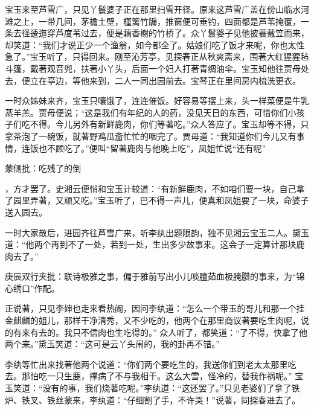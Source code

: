 \begin{parag}


    宝玉来至芦雪广，只见丫鬟婆子正在那里扫雪开径。原来这芦雪广盖在傍山临水河滩之上，一带几间，茅檐土壁，槿篱竹牖，推窗便可垂钓，四面都是芦苇掩覆，一条去径逶迤穿芦度苇过去，便是藕香榭的竹桥了。众丫鬟婆子见他披蓑戴笠而来，却笑道：“我们才说正少一个渔翁，如今都全了。姑娘们吃了饭才来呢，你也太性急了。”宝玉听了，只得回来。刚至沁芳亭，见探春正从秋爽斋来，围著大红猩猩毡斗篷，戴著观音兜，扶著小丫头，后面一个妇人打著青绸油伞。宝玉知他往贾母处去，便立在亭边，等他来到，二人一同出园前去。宝琴正在里间房内梳洗更衣。
\end{parag}


\begin{parag}


    一时众姊妹来齐，宝玉只嚷饿了，连连催饭。好容易等摆上来，头一样菜便是牛乳蒸羊羔。贾母便说；“这是我们有年纪的人的药，没见天日的东西，可惜你们小孩子们吃不得。今儿另外有新鲜鹿肉，你们等著吃。”众人答应了。宝玉却等不得，只拿茶泡了一碗饭，就著野鸡瓜齑忙忙的咽完了。贾母道：“我知道你们今儿又有事情，连饭也不顾吃了。”便叫“留著鹿肉与他晚上吃”，凤姐忙说“还有呢”\begin{note}蒙侧批：吃残了的倒\end{note}，方才罢了。史湘云便悄和宝玉计较道：“有新鲜鹿肉，不如咱们要一块，自己拿了园里弄著，又顽又吃。”宝玉听了，巴不得一声儿，便真和凤姐要了一块，命婆子送入园去。
\end{parag}


\begin{parag}


    一时大家散后，进园齐往芦雪广来，听李纨出题限韵，独不见湘云宝玉二人。黛玉道：“他两个再到不了一处，若到一处，生出多少故事来。这会子一定算计那块鹿肉去了。”\begin{note}庚辰双行夹批：联诗极雅之事，偏于雅前写出小儿啖膻茹血极腌臜的事来，为“锦心绣口”作配。\end{note}正说著，只见李婶也走来看热闹，因问李纨道：“怎么一个带玉的哥儿和那一个挂金麒麟的姐儿，那样干净清秀，又不少吃的，他两个在那里商议著要吃生肉呢，说的有来有去的。我只不信肉也生吃得的。” 众人听了，都笑道：“了不得，快拿了他两个来。”黛玉笑道：“这可是云丫头闹的，我的卦再不错。”
\end{parag}


\begin{parag}


    李纨等忙出来找著他两个说道：“你们两个要吃生的，我送你们到老太太那里吃去。那怕吃一只生鹿，撑病了不与我相干。这么大雪，怪冷的，替我作祸呢。” 宝玉笑道：“没有的事，我们烧著吃呢。”李纨道：“这还罢了。”只见老婆们了拿了铁炉、铁叉、铁丝蒙来，李纨道：“仔细割了手，不许哭！”说著，同探春进去了。
\end{parag}


